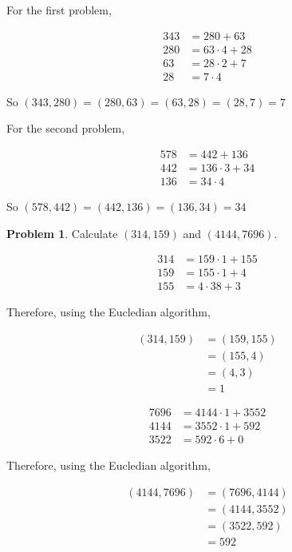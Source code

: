 \documentclass{article}
\theoremstyle{definition}
\newtheorem{problem}{Problem}
\begin{document}
  For the first problem,
  
  \begin{align*}
    343 &= 280 + 63 \\
    280 &= 63 \cdot 4 + 28 \\
    63 &= 28 \cdot 2 + 7 \\
    28 &= 7 \cdot 4
  \end{align*}
  
  So $(343, 280) = (280, 63) = (63, 28) = (28, 7) = 7$
  
  For the second problem,
  
  \begin{align*}
    578 &= 442 + 136 \\
    442 &= 136 \cdot 3 + 34 \\
    136 &= 34 \cdot 4
  \end{align*}
  
  So $(578, 442) = (442, 136) = (136, 34) = 34$
  
  \begin{problem}
    Calculate $(314, 159)$ and $(4144, 7696)$.
  \end{problem}
  
  \begin{align*}
    314 &= 159 \cdot 1 + 155 \\
    159 &= 155 \cdot 1 + 4 \\
    155 &= 4 \cdot 38 + 3
  \end{align*}
  
  Therefore, using the Eucledian algorithm,
  
  \begin{align*}
    (314, 159) &= (159, 155) \\
    &= (155, 4) \\
    &= (4, 3) \\
    &= 1
  \end{align*}
  
  \begin{align*}
    7696 &= 4144 \cdot 1 + 3552 \\
    4144 &= 3552 \cdot 1 + 592 \\
    3522 &= 592 \cdot 6 + 0
  \end{align*}
  
  Therefore, using the Eucledian algorithm,
  
  \begin{align*}
    (4144, 7696) &= (7696, 4144) \\
    &= (4144, 3552) \\
    &= (3522, 592) \\
    &= 592
  \end{align*}
  
\end{document}
